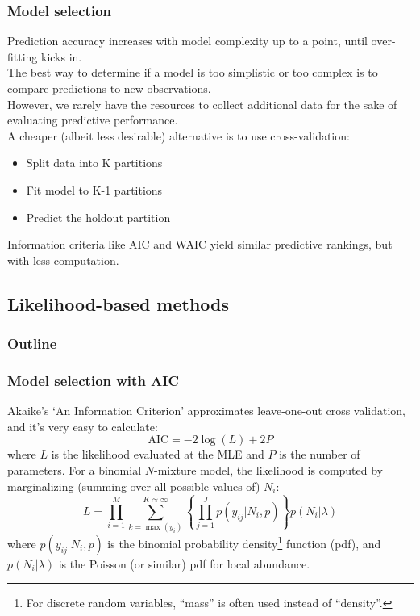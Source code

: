 \documentclass[color=usenames,dvipsnames]{beamer}\usepackage[]{graphicx}\usepackage[]{color}
\begin{document}
\begin{frame}
  \frametitle{Model selection}
  Prediction accuracy increases with model complexity up to a point,
  until over-fitting kicks in. \\
  \pause
  \vfill
  The best way to determine if a model is too simplistic or too
  complex is to compare predictions to new observations. \\
  \pause
  \vfill
  However, we rarely have the resources to
  collect additional data for the sake of evaluating predictive
  performance. \\ 
  \pause
  \vfill
  A cheaper (albeit less desirable) alternative is to use
  cross-validation: 
  \begin{itemize}
    \item Split data into K partitions
    \item Fit model to K-1 partitions
    \item Predict the holdout partition
  \end{itemize}
  \pause
  \vfill
  Information criteria like AIC and WAIC yield similar predictive
  rankings, but with less computation.    
\end{frame}



\subsection{Likelihood-based methods}



\begin{frame}
  \frametitle{Outline}
  \Large
\end{frame}



\bgroup
\let\oldfootnoterule\footnoterule
\def\footnoterule{\only<3->\oldfootnoterule}
\begin{frame}
  \frametitle{Model selection with AIC}
  \small
  Akaike's `An Information Criterion' approximates leave-one-out
  cross validation, and it's very easy to calculate:
  \[
     \mathrm{AIC} = -2 \log(L) + 2P 
   \]
   where $L$ is the likelihood evaluated at the MLE and $P$ is
   the number of parameters.
  \pause
  \vfill
  For a binomial $N$-mixture model, the likelihood is computed by
  marginalizing (summing over all possible values of) $N_i$:
  \[
     L = \prod_{i=1}^M \sum_{k=\max(y_i)}^{K\approx \infty}
     \left\{\prod_{j=1}^J p(y_{ij}|N_i,p)\right\}p(N_i|\lambda)
  \]
  \pause
  where $p(y_{ij}|N_i,p)$ is the binomial probability
  density\footnote<3->{\scriptsize For discrete random variables, 
    ``mass'' is often used instead of ``density''.} function 
  (pdf), and $p(N_i|\lambda)$ is the Poisson (or similar) pdf for
  local abundance. 
\end{frame}
\egroup
\end{document}
